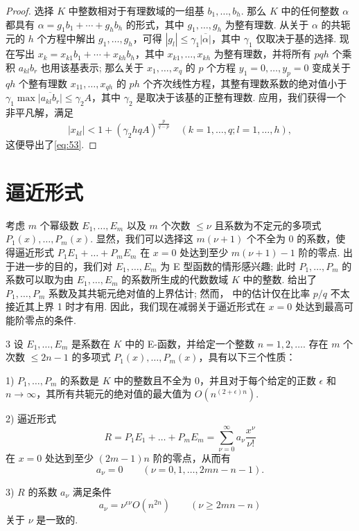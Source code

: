 \begin{proof}
选择 $K$ 中整数相对于有理数域的一组基 $b_1, \ldots, b_h$. 那么 $K$ 中的任何整数 $\alpha$ 都具有 $\alpha = g_1 b_1 + \cdots + g_h b_h$ 的形式，其中 $g_1, \ldots, g_h$ 为整有理数. 从关于 $\alpha$ 的共轭元的 $h$ 个方程中解出 $g_1, \dots, g_h$，可得 $|g_l| \le \gamma_1 \overline{|\alpha|}$，其中 $\gamma_1$ 仅取决于基的选择. 现在写出 $x_k = x_{k1} b_1 + \cdots + x_{kh} b_h$，其中 $x_{k1}, \ldots, x_{kh}$ 为整有理数，并将所有 $pqh$ 个乘积 $a_{kl} b_r$ 也用该基表示; 那么关于 $x_1, \ldots, x_q$ 的 $p$ 个方程 $y_1 = 0, \dots, y_p = 0$ 变成关于 $qh$ 个整有理数 $x_{11}, \dots, x_{qh}$ 的 $ph$ 个齐次线性方程，其整有理数系数的绝对值小于 $\gamma_1 \max \overline{|a_{kl} b_r|} \le \gamma_2 A$，其中 $\gamma_2$ 是取决于该基的正整有理数. 应用，我们获得一个非平凡解，满足
\[|x_{kl}| < 1 + (\gamma_2 hqA)^{\frac{p}{q-p}} \quad (k=1,\ldots,q; l=1,\ldots,h),\]
这便导出了\eqref{eq:53}.
\end{proof}

\section{逼近形式}

考虑 $m$ 个幂级数 $E_1, \dots, E_m$ 以及 $m$ 个次数 $\le \nu$ 且系数为不定元的多项式 $P_1(x), \dots, P_m(x)$. 显然，我们可以选择这 $m(\nu+1)$ 个不全为 0 的系数，使得逼近形式 $P_1 E_1 + \dots + P_m E_m$ 在 $x=0$ 处达到至少 $m(\nu+1)-1$ 阶的零点. 出于进一步的目的，我们对 $E_1, \dots, E_m$ 为 E 型函数的情形感兴趣; 此时 $P_1, \dots, P_m$ 的系数可以取为由 $E_1, \dots, E_m$ 的系数所生成的代数数域 $K$ 中的整数.  给出了 $P_1, \dots, P_m$ 系数及其共轭元绝对值的上界估计; 然而， 中的估计仅在比率 $p/q$ 不太接近其上界 1 时才有用. 因此，我们现在减弱关于逼近形式在 $x=0$ 处达到最高可能阶零点的条件.

\begin{mylemma}{}{3}
设 $E_1, \dots, E_m$ 是系数在 $K$ 中的 E-函数，并给定一个整数 $n=1,2,\dots$. 存在 $m$ 个次数 $\le 2n-1$ 的多项式 $P_1(x), \dots, P_m(x)$，具有以下三个性质：

1) $P_1, \dots, P_m$ 的系数是 $K$ 中的整数且不全为 0，并且对于每个给定的正数 $\epsilon$ 和 $n \to \infty$，其所有共轭元的绝对值的最大值为 $O(n^{(2+\epsilon)n})$.

2) 逼近形式
\begin{equation}
R = P_1 E_1 + \dots + P_m E_m = \sum_{\nu=0}^{\infty} a_{\nu} \frac{x^{\nu}}{\nu!} \tag{54}\label{eq:54}
\end{equation}
在 $x=0$ 处达到至少 $(2m-1)n$ 阶的零点，从而有
\begin{equation}
a_{\nu} = 0 \qquad (\nu = 0, 1, \dots, 2mn-n-1). \tag{55}\label{eq:55}
\end{equation}

3) $R$ 的系数 $a_{\nu}$ 满足条件
\[a_{\nu} = \nu^{\epsilon \nu} O(n^{2n}) \qquad (\nu \ge 2mn-n)\]
关于 $\nu$ 是一致的.
\end{mylemma}

